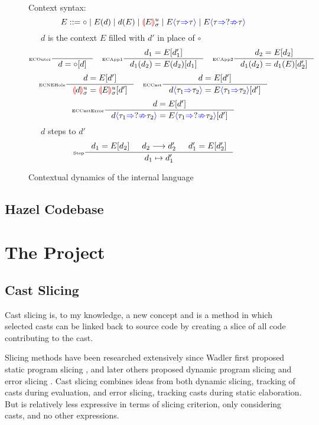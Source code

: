 \begin{figure}
Context syntax:
\[E ::= \circ \mid E(d) \mid d(E) \mid \hole[E]^u_\sigma \mid E\scast{\tau}{\tau} \mid E\scasterror{\tau}{\tau}\]
\small
{}\ \ \ $d$ is the context $E$ filled with $d'$ in place of $\circ$
\tiny
\[\inference[\tiny ECOuter]{}{d = \circ[d]} \quad
\inference[\tiny ECApp1]{d_1 = E[d_1']}{d_1(d_2) = E(d_2)[d_1]}\quad
\inference[\tiny ECApp2]{d_2 = E[d_2]}{d_1(d_2) = d_1(E)[d_2']}\]
\[\inference[\tiny ECNEHole]{d=E[d']}{\hole[d]^u_\sigma = \hole[E]^u_\sigma [d']}\quad
\inference[\tiny ECCast]{d=E[d']}{d\scast{\tau_1}{\tau_2} = E\scast{\tau_1}{\tau_2}[d']}\]
\[\inference[\tiny ECCastError]{d=E[d']}{d\scasterror{\tau_1}{\tau_2} = E\scasterror{\tau_1}{\tau_2}[d']}\]
\small
{}\ \ \ $d$ steps to $d'$
\tiny
\[\inference[\tiny Step]{d_1=E[d_2] & d_2 \longrightarrow d_2' & d_1' = E[d_2']}{d_1 \mapsto d_1'}\]
\caption{Contextual dynamics of the internal language}
\label{fig:dynamics}
\end{figure}

\subsection{Hazel Codebase}

\section{The Project}
\subsection{Cast Slicing}
Cast slicing is, to my knowledge, a new concept and is a method in which selected casts can be linked back to source code by creating a slice of all code contributing to the cast.\par 
Slicing methods have been researched extensively since Wadler first proposed static program slicing \cite{ProgSlice}, and later others proposed dynamic program slicing \cite{DynProgSlice} and error slicing \cite{ErrSlice}. Cast slicing combines ideas from both dynamic slicing, tracking of casts during evaluation, and error slicing, tracking casts during static elaboration. But is relatively less expressive in terms of slicing criterion, only considering casts, and no other expressions.


